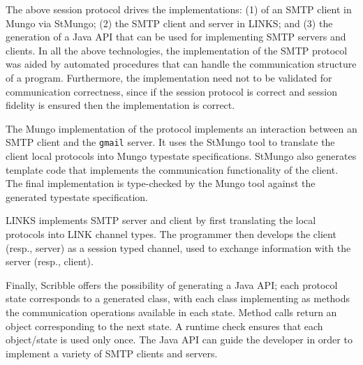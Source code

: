 
%


%

The above session protocol drives the implementations:
(1) of an SMTP client in Mungo via StMungo;
(2) the SMTP client and server in LINKS; and
(3) the generation of a Java API that can be used
for implementing SMTP servers and clients.
In all the above technologies,
the implementation of the SMTP protocol was
aided by automated procedures that can handle
the communication structure of a program. Furthermore,
the implementation need not to be validated for
communication correctness, since if the session protocol
is correct and session fidelity is ensured then
the implementation is correct.

The Mungo implementation of the protocol
implements an interaction between an SMTP client
and the \lstinline|gmail| server. It uses the StMungo
tool to translate the client local protocols into Mungo
typestate specifications. StMungo also generates template
code that implements the communication functionality of the client.
The final implementation is type-checked by the Mungo tool against
the generated typestate specification.

LINKS implements SMTP server and client by first translating
the local protocols into LINK channel types. The programmer
then develops the client (resp., server) as a session typed
channel, used to exchange information with the server (resp., client).

Finally, Scribble offers the possibility of generating a Java API;
each protocol state corresponds to a generated class, with each
class implementing as methods the communication operations available
in each state. Method calls return an object corresponding to the next state.
A runtime check ensures that each object/state is used only once.
The Java API can guide the developer in order to implement a variety
of SMTP clients and servers.
